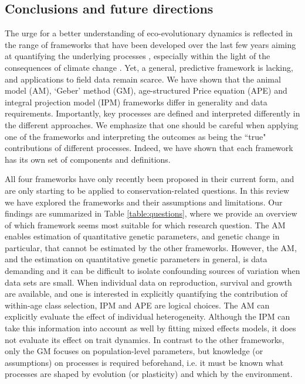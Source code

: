 \subsection*{Conclusions and future directions}
The urge for a better understanding of eco-evolutionary dynamics is reflected in the range of frameworks that have been developed over the last few years aiming at quantifying the underlying processes \parencite{Pelletier2009,Schoener2011}, especially within the light of the consequences of climate change \parencite{Gienapp2008,Lavergne2010}. Yet, a general, predictive framework is lacking, and applications to field data remain scarce. We have shown that the animal model (AM), `Geber' method (GM), age-structured Price equation (APE) and integral projection model (IPM) frameworks differ in generality and data requirements. Importantly, key processes are defined and interpreted differently in the different approaches. We emphasize that one should be careful when applying one of the frameworks and interpreting the outcomes as being the ``true" contributions of different processes. Indeed, we have shown that each framework has its own set of components and definitions.

All four frameworks have only recently been proposed in their current form, and are only starting to be applied to conservation-related questions. In this review we have explored the frameworks and their assumptions and limitations. Our findings are summarized in Table \ref{table:questions}, where we provide an overview of which framework seems most suitable for which research question. The AM enables estimation of quantitative genetic parameters, and genetic change in particular, that cannot be estimated by the other frameworks. However, the AM, and the estimation on quantitative genetic parameters in general, is data demanding and it can be difficult to isolate confounding sources of variation when data sets are small. When individual data on reproduction, survival and growth are available, and one is interested in explicitly quantifying the contribution of within-age class selection, IPM and APE are logical choices. The AM can explicitly evaluate the effect of individual heterogeneity. Although the IPM can take this information into account as well by fitting mixed effects models, it does not evaluate its effect on trait dynamics. In contrast to the other frameworks, only the GM focuses on population-level parameters, but knowledge (or assumptions) on processes is required beforehand, i.e. it must be known what processes are shaped by evolution (or plasticity) and which by the environment. 

